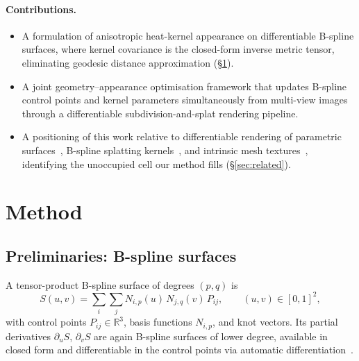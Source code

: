 \documentclass[acmtog, review=true, authorversion=false]{acmart}
\begin{document}
\paragraph{Contributions.}
\begin{itemize}
  \item A formulation of anisotropic heat-kernel appearance on
        differentiable B-spline surfaces, where kernel covariance is the
        closed-form inverse metric tensor, eliminating geodesic distance
        approximation (\S\ref{sec:method}).
  \item A joint geometry--appearance optimisation framework that updates
        B-spline control points and kernel parameters simultaneously from
        multi-view images through a differentiable subdivision-and-splat
        rendering pipeline.
  \item A positioning of this work relative to differentiable rendering of
        parametric surfaces~\cite{worchelalexa2023}, B-spline splatting
        kernels~\cite{splinesplat}, and intrinsic mesh textures~\cite{hktex},
        identifying the unoccupied cell our method fills (\S\ref{sec:related}).
\end{itemize}



\section{Method}\label{sec:method}

\subsection{Preliminaries: B-spline surfaces}
A tensor-product B-spline surface of degrees $(p,q)$ is
\[
  S(u,v) = \sum_{i}\sum_{j} N_{i,p}(u)\,N_{j,q}(v)\,P_{ij},
  \qquad (u,v)\in[0,1]^2,
\]
with control points $P_{ij}\in\mathbb{R}^3$, basis functions $N_{i,p}$, and
knot vectors. Its partial derivatives $\partial_u S$, $\partial_v S$ are
again B-spline surfaces of lower degree, available in closed form and
differentiable in the control points via automatic
differentiation~\cite{nurbsdiff,diffnurbs}.
\end{document}
